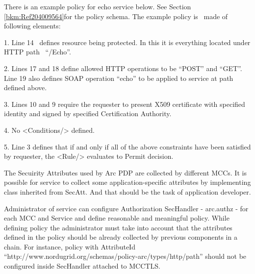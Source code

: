 \documentclass[a4paper]{article}
\begin{document}
{\upshape\color{black}
There is an example policy for echo service below. See Section
\ref{bkm:Ref204009564}for the policy schema. The example policy is
\ made of following elements: }

{\color{black}
1. Line 14 \ defines resource being protected. In this it is everything
located under HTTP path
\ {\textquotedblleft}/Echo{\textquotedblright}.}

{\color{black}
2. Lines 17 and 18 define allowed HTTP operations to be
{\textquotedblleft}POST{\textquotedblright} and
{\textquotedblleft}GET{\textquotedblright}. Line 19 also defines SOAP
operation {\textquotedblleft}echo{\textquotedblright} to be applied to
service at path defined above.}

{\color{black}
3. Lines 10 and 9 require the requester to present X509 certificate with
specified identity and signed by specified Certification Authority.}

{\color{black}
4. No {\textless}Conditions/{\textgreater} defined.}

{\color{black}
5. Line 3 defines that if and only if all of the above constraints have
been satisfied by requester, the {\textless}Rule/{\textgreater}
evaluates to Permit decision.}

{\color{black}
The Secuirity Attributes used by Arc PDP are collected by different
MCCs. It is possible for service to collect some application-specific
attributes by implementing class inherited from SecAtt. And that should
be the task of application developer.}

{\upshape\color{black}
Administrator of service can configure Authorization SecHandler -
arc.authz - for each MCC and Service and define reasonable and
meaningful policy. While defining policy the administrator must take
into account that the attributes defined in the policy should be
already collected by previous components in a chain. For instance,
policy with AttributeId
{\textquotedblleft}http://www.nordugrid.org/schemas/policy-arc/types/http/path{\textquotedblright}
should not be configured inside SecHandler attached to MCCTLS. }
\end{document}
